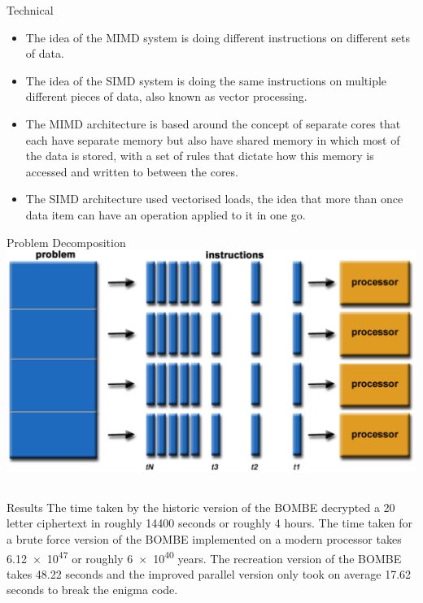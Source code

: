 \documentclass[final]{beamer}
\begin{document}
\begin{frame}{}
\begin{columns}[t]
\begin{column}{.32\linewidth}
        \begin{block}{Technical}
          \begin{itemize}
          \item The idea of the MIMD system is doing different instructions on different sets of data.
          \item The idea of the SIMD system is doing the same instructions on multiple different pieces of data, also known as vector processing.
          \item The MIMD architecture is based around the concept of separate cores that each have separate memory but also have shared memory in which most of the data is stored, with a set of rules that dictate how this memory is accessed and written to between the cores.
          \item The SIMD architecture used vectorised loads, the idea that more than once data item can have an operation applied to it in one go.
          \end{itemize}
        \end{block}
        
	\begin{block}{Problem Decomposition}
          \includegraphics[width=\columnwidth]{problemDecomp.png} 
        \end{block}

      \end{column}      
      
      
    \end{columns}

  \vfill
    \begin{block}{\centering Results}
		The time taken by the historic version of the BOMBE decrypted a 20 letter ciphertext in roughly 14400 seconds or roughly 4 hours. The time taken for a brute force version of the BOMBE implemented on a modern processor takes \num{6.12e47} or roughly \num{6e40} years. The recreation version of the BOMBE takes 48.22 seconds and the improved parallel version only took on average 17.62 seconds to break the enigma code.
    \end{block}
    \vfill

  \end{frame}
\end{document}
